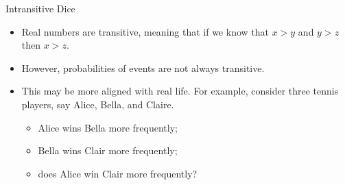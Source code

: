 \documentclass[serif,envcountsect,table,t%
]{beamer}%
\begin{document}
\begin{frame}{Intransitive Dice}
  \begin{itemize}
  \item Real numbers are transitive, meaning that if we know that $x>y$ and
    $y>z$ then $x>z$.
  \item However, probabilities of events are not always transitive.
  \item This may be more aligned with real life. For example, consider three
    tennis players, say Alice, Bella, and Claire.
    \begin{itemize}
    \item Alice wins Bella more frequently;
    \item Bella wins Clair more frequently;
    \item does Alice win Clair more frequently?
    \end{itemize}
  \end{itemize}
\end{frame}
\end{document}
